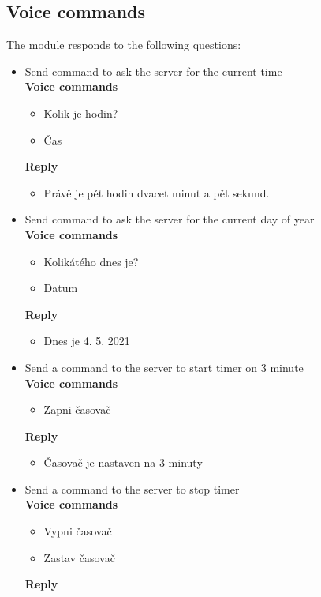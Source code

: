 \subsection{Voice commands}
The module responds to the following questions:
\begin{itemize}
    \item Send command to ask the server for the current time\\
    \textbf{Voice commands}
    \begin{itemize}
        \item Kolik je hodin?
        \item Čas
    \end{itemize}
    \textbf{Reply}
    \begin{itemize}
        \item Právě je pět hodin dvacet minut a pět sekund.
    \end{itemize}
    \item Send command to ask the server for the current day of year\\
    \textbf{Voice commands}
    \begin{itemize}
        \item Kolikátého dnes je?
        \item Datum
    \end{itemize}
    \textbf{Reply}
    \begin{itemize}
        \item Dnes je 4. 5. 2021
    \end{itemize}
    \item Send a command to the server to start timer on 3 minute\\
    \textbf{Voice commands}
    \begin{itemize}
        \item Zapni časovač
    \end{itemize}
    \textbf{Reply}
    \begin{itemize}
        \item Časovač je nastaven na 3 minuty
    \end{itemize}
    \item Send a command to the server to stop timer\\
    \textbf{Voice commands}
    \begin{itemize}
        \item Vypni časovač
        \item Zastav časovač
    \end{itemize}
    \textbf{Reply}

\end{itemize}
